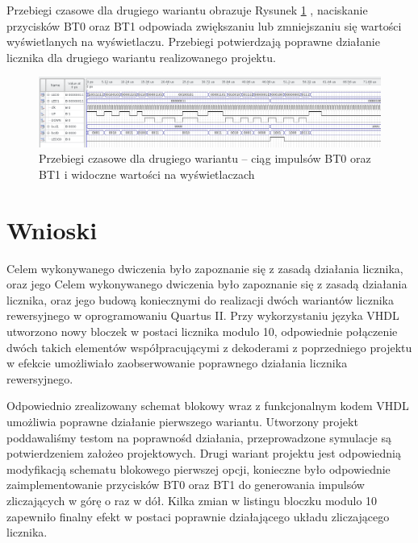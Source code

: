 \documentclass{classrep}
\begin{document}


Przebiegi czasowe dla drugiego wariantu obrazuje Rysunek \ref{fig:symhex4} , naciskanie przycisków BT0 oraz BT1
odpowiada zwiększaniu lub zmniejszaniu się wartości wyświetlanych na wyświetlaczu.
Przebiegi potwierdzają poprawne działanie licznika dla drugiego wariantu realizowanego projektu.

\begin{figure}[H]
	\centering
	\includegraphics[width=1.0\linewidth]{up_down_1_2}
	\caption{Przebiegi czasowe dla drugiego wariantu – ciąg impulsów BT0 oraz BT1 i widoczne
	wartości na wyświetlaczach}
	\label{fig:symhex4}
\end{figure}

\section{Wnioski}

Celem wykonywanego dwiczenia było zapoznanie się z zasadą działania licznika, oraz jego Celem wykonywanego dwiczenia było zapoznanie się z zasadą działania licznika, oraz jego budową
koniecznymi do realizacji dwóch wariantów licznika rewersyjnego w oprogramowaniu Quartus II. Przy
wykorzystaniu języka VHDL utworzono nowy bloczek w postaci licznika modulo 10, odpowiednie
połączenie dwóch takich elementów współpracującymi z dekoderami z poprzedniego projektu w
efekcie umożliwiało zaobserwowanie poprawnego działania licznika rewersyjnego. 

Odpowiednio zrealizowany schemat blokowy wraz z funkcjonalnym kodem VHDL umożliwia poprawne działanie
pierwszego wariantu. Utworzony projekt poddawaliśmy testom na poprawnośd działania,
przeprowadzone symulacje są potwierdzeniem założeo projektowych. Drugi wariant projektu jest
odpowiednią modyfikacją schematu blokowego pierwszej opcji, konieczne było odpowiednie
zaimplementowanie przycisków BT0 oraz BT1 do generowania impulsów zliczających w górę o raz w
dół. Kilka zmian w listingu bloczku modulo 10 zapewniło finalny efekt w postaci poprawnie
działającego układu zliczającego licznika. 
\end{document}
